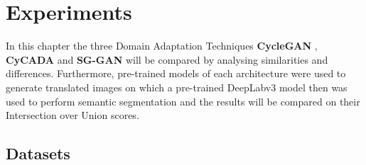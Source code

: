 \chapter{Experiments}
\label{sec:experiments}

In this chapter the three Domain Adaptation Techniques \textbf{CycleGAN} \cite{DBLP:journals/corr/ZhuPIE17}, \textbf{CyCADA} \cite{DBLP:journals/corr/abs-1711-03213} and \textbf{SG-GAN} \cite{DBLP:journals/corr/abs-1801-01726} will be compared by analysing similarities and differences. Furthermore, pre-trained models of each architecture were used to generate translated images on which a pre-trained DeepLabv3 \cite{DBLP:journals/corr/ChenPSA17} model then was used to perform semantic segmentation and the results will be compared on their Intersection over Union scores.


\section{Datasets}

